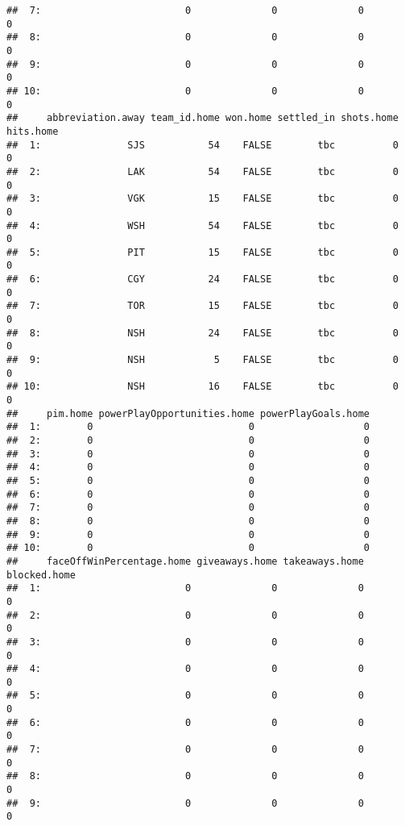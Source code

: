 \documentclass[
]{article}
\begin{document}
\begin{verbatim}
##  7:                         0              0              0            0
##  8:                         0              0              0            0
##  9:                         0              0              0            0
## 10:                         0              0              0            0
##     abbreviation.away team_id.home won.home settled_in shots.home hits.home
##  1:               SJS           54    FALSE        tbc          0         0
##  2:               LAK           54    FALSE        tbc          0         0
##  3:               VGK           15    FALSE        tbc          0         0
##  4:               WSH           54    FALSE        tbc          0         0
##  5:               PIT           15    FALSE        tbc          0         0
##  6:               CGY           24    FALSE        tbc          0         0
##  7:               TOR           15    FALSE        tbc          0         0
##  8:               NSH           24    FALSE        tbc          0         0
##  9:               NSH            5    FALSE        tbc          0         0
## 10:               NSH           16    FALSE        tbc          0         0
##     pim.home powerPlayOpportunities.home powerPlayGoals.home
##  1:        0                           0                   0
##  2:        0                           0                   0
##  3:        0                           0                   0
##  4:        0                           0                   0
##  5:        0                           0                   0
##  6:        0                           0                   0
##  7:        0                           0                   0
##  8:        0                           0                   0
##  9:        0                           0                   0
## 10:        0                           0                   0
##     faceOffWinPercentage.home giveaways.home takeaways.home blocked.home
##  1:                         0              0              0            0
##  2:                         0              0              0            0
##  3:                         0              0              0            0
##  4:                         0              0              0            0
##  5:                         0              0              0            0
##  6:                         0              0              0            0
##  7:                         0              0              0            0
##  8:                         0              0              0            0
##  9:                         0              0              0            0

\end{verbatim}
\end{document}
